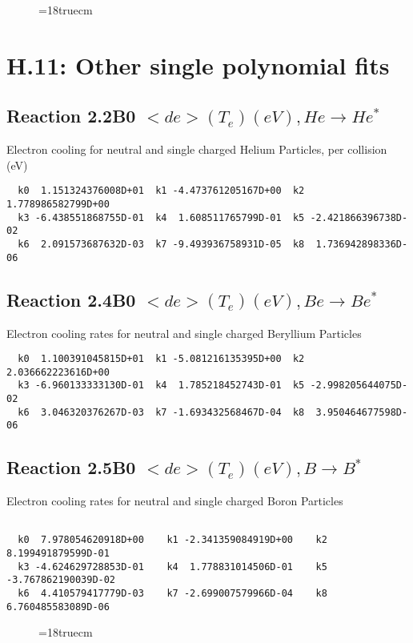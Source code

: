 \begin{figure} \label{2.3.6rl}
\epsfxsize=18truecm
\end{figure}
\section{H.11: Other single polynomial fits}

\subsection{
Reaction 2.2B0   $ <de>(T_e)  (eV), He \rightarrow He^* $
}

  Electron cooling for neutral and single
  charged Helium Particles, per collision (eV)

\begin{verbatim}
  k0  1.151324376008D+01  k1 -4.473761205167D+00  k2  1.778986582799D+00
  k3 -6.438551868755D-01  k4  1.608511765799D-01  k5 -2.421866396738D-02
  k6  2.091573687632D-03  k7 -9.493936758931D-05  k8  1.736942898336D-06

\end{verbatim}


\subsection{
Reaction 2.4B0  $  <de>(T_e)  (eV), Be \rightarrow Be^*$
}

  Electron cooling rates for neutral and single
  charged Beryllium Particles

\begin{verbatim}
  k0  1.100391045815D+01  k1 -5.081216135395D+00  k2  2.036662223616D+00
  k3 -6.960133333130D-01  k4  1.785218452743D-01  k5 -2.998205644075D-02
  k6  3.046320376267D-03  k7 -1.693432568467D-04  k8  3.950464677598D-06

\end{verbatim}
\subsection{
Reaction 2.5B0   $ <de>(T_e)  (eV), B \rightarrow B^* $
}

 Electron cooling rates for neutral and single
 charged Boron Particles

\begin{verbatim}

  k0  7.978054620918D+00    k1 -2.341359084919D+00    k2  8.199491879599D-01
  k3 -4.624629728853D-01    k4  1.778831014506D-01    k5 -3.767862190039D-02
  k6  4.410579417779D-03    k7 -2.699007579966D-04    k8  6.760485583089D-06

\end{verbatim}
\begin{figure} \label{2.5ll}
\epsfxsize=18truecm
\end{figure}
\newpage

